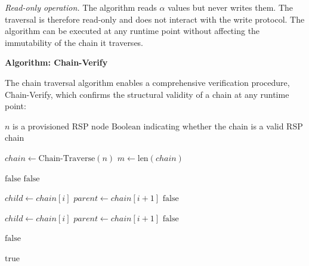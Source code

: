 \textit{Read-only operation.} The algorithm reads $\alpha$ values but never writes them. The traversal is therefore read-only and does not interact with the write protocol. The algorithm can be executed at any runtime point without affecting the immutability of the chain it traverses.

\medskip
\noindent\textbf{Algorithm: Chain-Verify}

The chain traversal algorithm enables a comprehensive verification procedure, Chain-Verify, which confirms the structural validity of a chain at any runtime point:

\begin{algorithm}
\caption{Chain-Verify($n$) — Verify the authorization chain from node $n$ to human anchor}
\label{alg:chain-verify}
\begin{algorithmic}[1]
\REQUIRE $n$ is a provisioned RSP node
\ENSURE $\text{Boolean}$ indicating whether the chain is a valid RSP chain

\STATE $chain \leftarrow \text{Chain-Traverse}(n)$
\STATE $m \leftarrow \text{len}(chain)$

\STATE {}
    \STATE \RETURN $\text{false}$ 
\ENDIF
{}
    \STATE \RETURN $\text{false}$ 
\ENDIF

\STATE {}
    \STATE $child \leftarrow chain[i]$
    \STATE $parent \leftarrow chain[i+1]$
        \STATE \RETURN $\text{false}$ 
    \ENDIF
\ENDFOR

\STATE {}
    \STATE $child \leftarrow chain[i]$
    \STATE $parent \leftarrow chain[i+1]$
        \STATE \RETURN $\text{false}$ 
    \ENDIF
\ENDFOR

\STATE {}
        \STATE \RETURN $\text{false}$ 
    \ENDIF
\ENDFOR

\RETURN $\text{true}$
\end{algorithmic}
\end{algorithm}

